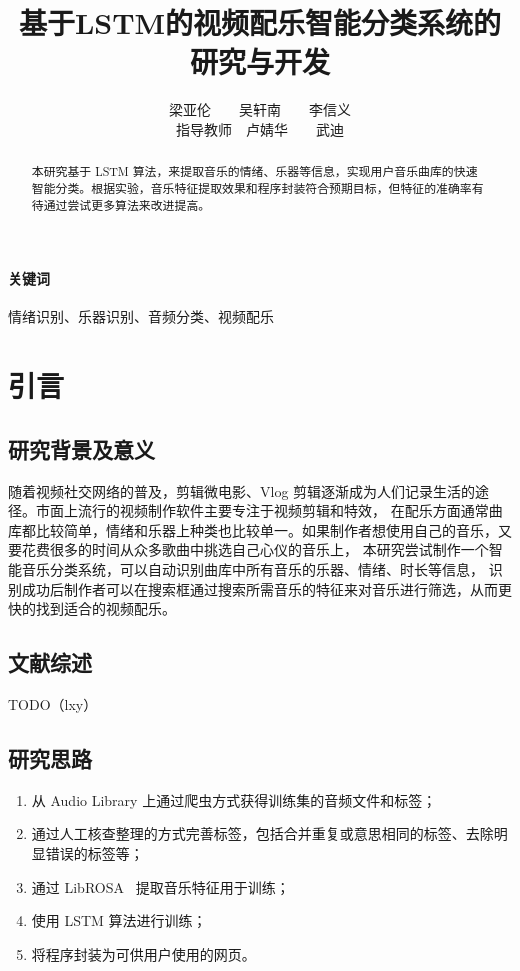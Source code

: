 \documentclass[a4paper,utf8,10pt]{article}
\title{基于LSTM的视频配乐智能分类系统的研究与开发}
\author{梁亚伦　　吴轩南　　李信义 \\ 指导教师　卢婧华　　武迪}
\affil{中国人民大学附属中学　　北京　　100080}
\date{}
\newcommand{\sept}{\setlength\itemsep{-4pt}}
\begin{document}
\maketitle

\begin{abstract}
本研究基于 LSTM 算法，来提取音乐的情绪、乐器等信息，实现用户音乐曲库的快速智能分类。根据实验，音乐特征提取效果和程序封装符合预期目标，但特征的准确率有待通过尝试更多算法来改进提高。
\end{abstract}

\paragraph{关键词} 情绪识别、乐器识别、音频分类、视频配乐
\vspace{\baselineskip}

\section{引言}

\subsection{研究背景及意义}

随着视频社交网络的普及，剪辑微电影、Vlog 剪辑逐渐成为人们记录生活的途径。市面上流行的视频制作软件主要专注于视频剪辑和特效，
在配乐方面通常曲库都比较简单，情绪和乐器上种类也比较单一。如果制作者想使用自己的音乐，又要花费很多的时间从众多歌曲中挑选自己心仪的音乐上，
本研究尝试制作一个智能音乐分类系统，可以自动识别曲库中所有音乐的乐器、情绪、时长等信息，
识别成功后制作者可以在搜索框通过搜索所需音乐的特征来对音乐进行筛选，从而更快的找到适合的视频配乐。

\subsection{文献综述}

TODO（lxy）\cite{boixx14}

\subsection{研究思路}

\begin{enumerate}
  \sept
  \item 从 Audio Library 上通过爬虫方式获得训练集的音频文件和标签；
  \item 通过人工核查整理的方式完善标签，包括合并重复或意思相同的标签、去除明显错误的标签等；
  \item 通过 LibROSA~\cite{librosa18} 提取音乐特征用于训练；
  \item 使用 LSTM 算法进行训练；
  \item 将程序封装为可供用户使用的网页。
\end{enumerate}
\end{document}

